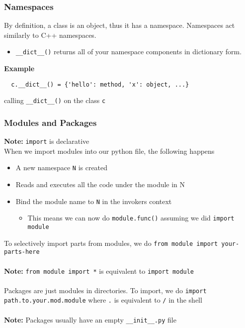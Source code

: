 \documentclass[13pt]{article}
\begin{document}
        \subsubsection{Namespaces}
        By definition, a class is an object, thus it has a namespace. Namespaces act similarly to C++ namespaces.
        \begin{itemize}[leftmargin = 0pt]
        \item [] \texttt{\_\_dict\_\_()} returns all of your namespace components in dictionary form.
        \end{itemize}
        \textbf{Example}
\begin{verbatim}
  c.__dict__() = {'hello': method, 'x': object, ...} \end{verbatim}
calling \texttt{\_\_dict\_\_()} on the class \texttt{c}

\subsubsection{Modules and Packages}
\textbf{Note:} \texttt{import} is declarative \\
When we import modules into our python file, the following happens
\begin{itemize}[leftmargin = 0pt]
\item [] A new namespace \texttt{N} is created
\item [] Reads and executes all the code under the module in N
\item [] Bind the module name to \texttt{N} in the invokers context
  \begin{itemize}[leftmargin = 0pt]
  \item [] This means we can now do \texttt{module.func()} assuming we did \texttt{import module}
  \end{itemize}
\end{itemize}
To selectively import parts from modules, we do \texttt{from module import your-parts-here} \\ \\
\textbf{Note:} \texttt{from module import *} is equivalent to \texttt{import module} \\ \\
Packages are just modules in directories. To import, we do \texttt{import path.to.your.mod.module} where \texttt{.} is equivalent to \texttt{/} in the shell \\ \\
\textbf{Note:} Packages usually have an empty \texttt{\_\_init\_\_.py} file
\end{document}
